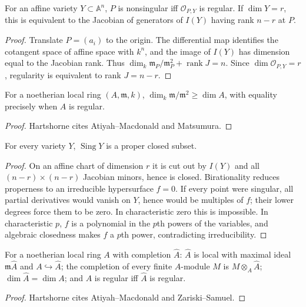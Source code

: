 \begin{theorem}
\label{thm:ha-ch1-5-1}
For an affine variety $Y\subset\mathbb A^n$, $P$ is nonsingular iff $\mathcal O_{P,Y}$ is
regular.  If $\dim Y=r$, this is equivalent to the Jacobian of generators of $I(Y)$ having rank
$n-r$ at $P$.
\end{theorem}
\begin{proof}
Translate $P=(a_i)$ to the origin.  The differential map identifies the cotangent space of affine
space with $k^n$, and the image of $I(Y)$ has dimension equal to the Jacobian rank.  Thus
\(\dim_k\mathfrak m_P/\mathfrak m_P^2+\operatorname{rank}J=n\).  Since
\(\dim\mathcal O_{P,Y}=r\), regularity is equivalent to rank $J=n-r$.
\end{proof}

\begin{proposition}
\label{prop:ha-ch1-5-2A}
For a noetherian local ring $(A,\mathfrak m,k)$, \(\dim_k\mathfrak m/\mathfrak m^2\ge\dim A\), with equality precisely when $A$ is regular.
\end{proposition}
\begin{proof}
Hartshorne cites Atiyah--Macdonald and Matsumura.
\end{proof}

\begin{theorem}
\label{thm:ha-ch1-5-3}
For every variety $Y$, $\operatorname{Sing}Y$ is a proper closed subset.
\end{theorem}
\begin{proof}
On an affine chart of dimension $r$ it is cut out by $I(Y)$ and all $(n-r)\times(n-r)$ Jacobian
minors, hence is closed.  Birationality reduces properness to an irreducible hypersurface
$f=0$.  If every point were singular, all partial derivatives would vanish on $Y$, hence would
be multiples of $f$; their lower degrees force them to be zero.  In characteristic zero this is
impossible.  In characteristic $p$, $f$ is a polynomial in the $p$th powers of the variables,
and algebraic closedness makes $f$ a $p$th power, contradicting irreducibility.
\end{proof}

\begin{theorem}
\label{thm:ha-ch1-5-4A}
For a noetherian local ring $A$ with completion $\widehat A$: $\widehat A$ is local with maximal
ideal $\mathfrak m\widehat A$ and $A\hookrightarrow\widehat A$; the completion of every finite
$A$-module $M$ is $M\otimes_A\widehat A$; \(\dim\widehat A=\dim A\); and $A$ is regular iff
$\widehat A$ is regular.
\end{theorem}
\begin{proof}
Hartshorne cites Atiyah--Macdonald and Zariski--Samuel.
\end{proof}

